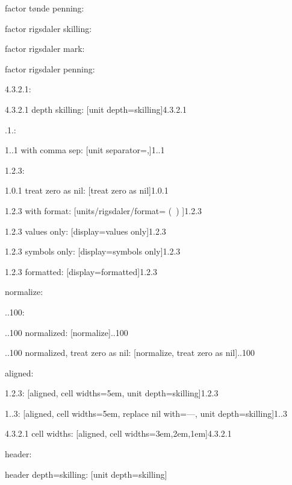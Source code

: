 \documentclass{article}
\begin{document}
factor tønde penning: \hfill {}

factor rigsdaler skilling: \hfill {}

factor rigsdaler mark: \hfill {}

factor rigsdaler penning: \hfill {}

4.3.2.1: \hfill {}

4.3.2.1 depth skilling: \hfill {}[unit depth=skilling]{4.3.2.1}

.1.: \hfill {}

1..1 with comma sep: \hfill {}[unit separator={,}]{1..1}

1.2.3: \hfill {}

1.0.1 treat zero as nil: \hfill {}[treat zero as nil]{1.0.1}

1.2.3 with format: \hfill {}[units/rigsdaler/format={ (\SYMBOL\ \VALUE) }]{1.2.3}

1.2.3 values only: \hfill {}[display=values only]{1.2.3}

1.2.3 symbols only: \hfill {}[display=symbols only]{1.2.3}

1.2.3 formatted: \hfill {}[display=formatted]{1.2.3}

normalize:

..100: \hfill {}

..100 normalized: \hfill {}[normalize]{..100}

..100 normalized, treat zero as nil: \hfill {}[normalize, treat zero as nil]{..100}

aligned:

1.2.3: \hfill {}[aligned, cell widths=5em, unit depth=skilling]{1.2.3}

1..3: \hfill {}[aligned, cell widths=5em, replace nil with={---}, unit depth=skilling]{1..3}

4.3.2.1 cell widths: \hfill {}[aligned, cell widths={3em,2em,1em}]{4.3.2.1}

header: \hfill {}

header depth=skilling: \hfill {}[unit depth=skilling]
\end{document}
